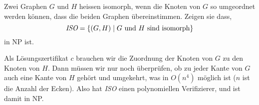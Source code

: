 Zwei Graphen $G$ und $H$ heissen isomorph, wenn die Knoten von $G$ so
umgeordnet werden können, dass die beiden Graphen übereinstimmen.
Zeigen sie dass,
\[
\text{\it ISO} = \{(G,H)\; |\;\text{$G$ und $H$ sind isomorph}\}
\]
in NP ist.

\begin{loesung}
Als Lösungszertifikat $c$ brauchen wir die Zuordnung der Knoten
von $G$ zu den Knoten von $H$. Dann müssen wir nur noch überprüfen,
ob zu jeder Kante von $G$ auch eine Kante von $H$ gehört und
umgekehrt, was in $O(n^4)$ möglich ist ($n$ ist die Anzahl der Ecken).
Also hat {\it ISO} einen polynomiellen Verifizierer, und ist damit
in NP.
\end{loesung}
